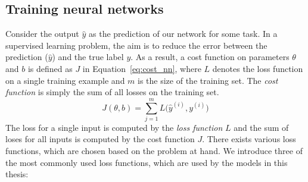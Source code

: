 \subsection{Training neural networks}
Consider the output $\hat { y } $ as the prediction of our network for some task. In a supervised learning problem, the aim is to reduce the error between the prediction ($\hat { y } $) and the true label $y$. As a result, a cost function on parameters $\theta$ and $b$ is defined as $J$ in Equation~\ref{eq:cost_nn}, where $L$ denotes the loss function on a single training example and $m$ is the size of the training set. The \emph{cost function} is simply the sum of all losses on the training set.
\begin{equation}
J(\theta,b)=\sum _{ j=1 }^{ m }{ L( } \hat { y }^{ (i) } ,y^{ (i) })
\label{eq:cost_nn}
\end{equation}
The loss for a single input is computed by the \emph{loss function} $L$ and the sum of loses for all inputs is computed by the cost function $J$. There exists various loss functions, which are chosen based on the problem at hand. We introduce three of the most commonly used loss functions, which are used by the models in this thesis: \\
